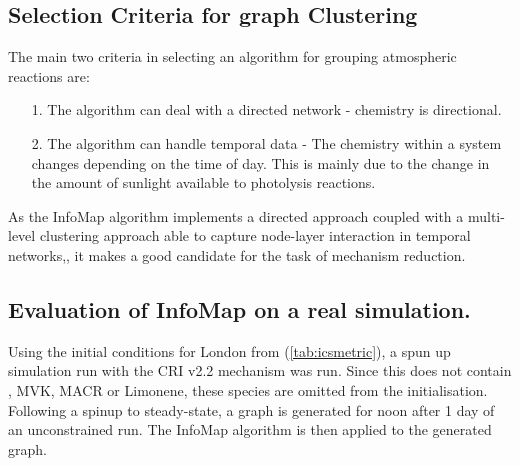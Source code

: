 %




\subsection{Selection Criteria for graph Clustering}

The main two criteria in selecting an algorithm for grouping atmospheric reactions are:

\begin{itemize}
    \item[1.] The algorithm can deal with a directed network - chemistry is directional.
    \item[2.] The algorithm can handle temporal data - The chemistry within a system changes depending on the time of day. This is mainly due to the change in the amount of sunlight available to photolysis reactions. 
\end{itemize}

As the InfoMap algorithm implements a directed approach coupled with a multi-level clustering approach able to capture node-layer interaction in temporal networks,\citep{infointermittent}, it makes a good candidate for the task of mechanism reduction. 

\subsection{Evaluation of InfoMap on a real simulation.}

Using the initial conditions for London from (\autoref{tab:icsmetric}), a spun up simulation run with the CRI v2.2 mechanism was run. Since this does not contain , MVK, MACR or Limonene, these species are omitted from the initialisation. Following a spinup to steady-state, a graph is generated for noon after 1 day of an unconstrained run. The InfoMap algorithm is then applied to the generated graph.


